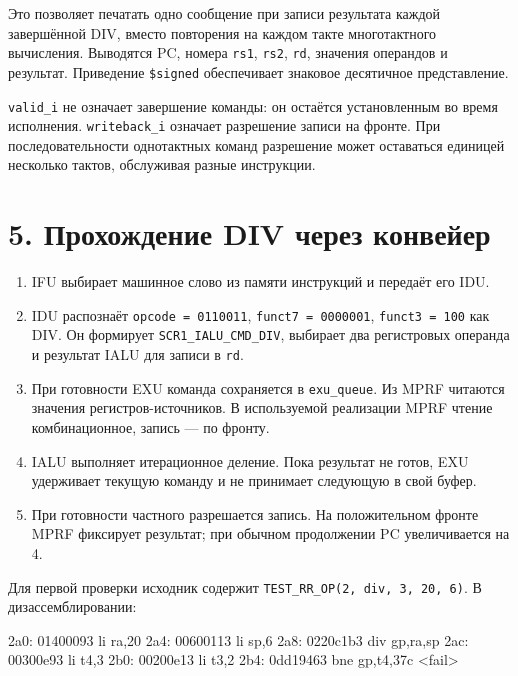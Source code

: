 \documentclass[
  russian,
]{article}
\newenvironment{Shaded}{}{}
\newcommand{\NormalTok}[1]{#1}
\providecommand{\tightlist}{%
  \setlength{\itemsep}{0pt}\setlength{\parskip}{0pt}}
\begin{document}
Это позволяет печатать одно сообщение при записи результата каждой
завершённой DIV, вместо повторения на каждом такте многотактного
вычисления. Выводятся PC, номера \texttt{rs1}, \texttt{rs2},
\texttt{rd}, значения операндов и результат. Приведение
\texttt{\$signed} обеспечивает знаковое десятичное представление.

\texttt{valid\_i} не означает завершение команды: он остаётся
установленным во время исполнения. \texttt{writeback\_i} означает
разрешение записи на фронте. При последовательности однотактных команд
разрешение может оставаться единицей несколько тактов, обслуживая разные
инструкции.

\section{5. Прохождение DIV через
конвейер}\label{ux43fux440ux43eux445ux43eux436ux434ux435ux43dux438ux435-div-ux447ux435ux440ux435ux437-ux43aux43eux43dux432ux435ux439ux435ux440}

\begin{enumerate}
\def\labelenumi{\arabic{enumi}.}
\tightlist
\item
  IFU выбирает машинное слово из памяти инструкций и передаёт его IDU.
\item
  IDU распознаёт \texttt{opcode\ =\ 0110011},
  \texttt{funct7\ =\ 0000001}, \texttt{funct3\ =\ 100} как DIV. Он
  формирует \texttt{SCR1\_IALU\_CMD\_DIV}, выбирает два регистровых
  операнда и результат IALU для записи в \texttt{rd}.
\item
  При готовности EXU команда сохраняется в \texttt{exu\_queue}. Из MPRF
  читаются значения регистров-источников. В используемой реализации MPRF
  чтение комбинационное, запись --- по фронту.
\item
  IALU выполняет итерационное деление. Пока результат не готов, EXU
  удерживает текущую команду и не принимает следующую в свой буфер.
\item
  При готовности частного разрешается запись. На положительном фронте
  MPRF фиксирует результат; при обычном продолжении PC увеличивается на
  4.
\end{enumerate}

Для первой проверки исходник содержит
\texttt{TEST\_RR\_OP(2,\ div,\ 3,\ 20,\ 6)}. В дизассемблировании:

\begin{Shaded}
\begin{Highlighting}[]
\NormalTok{2a0: 01400093  li  ra,20}
\NormalTok{2a4: 00600113  li  sp,6}
\NormalTok{2a8: 0220c1b3  div gp,ra,sp}
\NormalTok{2ac: 00300e93  li  t4,3}
\NormalTok{2b0: 00200e13  li  t3,2}
\NormalTok{2b4: 0dd19463  bne gp,t4,37c \textless{}fail\textgreater{}}
\end{Highlighting}
\end{Shaded}
\end{document}
